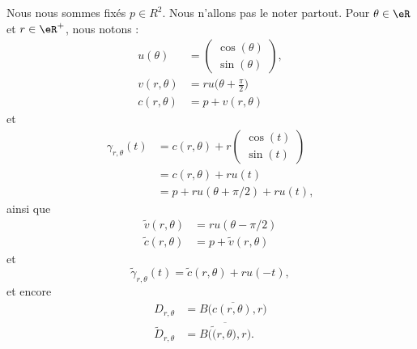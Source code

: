 \begin{normaltext}		\label{NORMooGADXooWShKTZ}

	Nous nous sommes fixés \( p\in R^2\). Nous n'allons pas le noter partout. Pour \( \theta\in \eR\) et \( r\in \eR^+\), nous notons :
	\begin{subequations}
		\begin{align}
			u(\theta)   & =\begin{pmatrix}
				               \cos(\theta) \\
				               \sin(\theta)
			               \end{pmatrix},                       \\
			v(r,\theta) & =ru\big( \theta+\frac{ \pi }{2} \big) \\
			c(r,\theta) & =p+v(r,\theta)
		\end{align}
	\end{subequations}
	et
	\begin{subequations}		\label{EQooNQYRooPaYRuV}
		\begin{align}
			\gamma_{r,\theta}(t) & =c(r,\theta)+r\begin{pmatrix}
				                                     \cos(t) \\
				                                     \sin(t)
			                                     \end{pmatrix} \\
			                     & =c(r,\theta)+ru(t)           \\
			                     & =p+ru(\theta+\pi/2)+ru(t),
		\end{align}
	\end{subequations}
	ainsi que
	\begin{subequations}
		\begin{align}
			\tilde v(r,\theta) & =ru(\theta-\pi/2)     \\
			\tilde c(r,\theta) & =p+\tilde v(r,\theta)
		\end{align}
	\end{subequations}
	et
	\begin{equation}		\label{EQooXPTFooBCszbW}
		\tilde \gamma_{r,\theta}(t)=\tilde c(r,\theta)+r u(-t),
	\end{equation}
	et encore
	\begin{subequations}
		\begin{align}
			D_{r,\theta}        & = \overline{  B\big( c(r,\theta),r \big)  }        \\
			\tilde D_{r,\theta} & = \overline{  B\big( \tilde (r,\theta),r \big)  }.
		\end{align}
	\end{subequations}
\end{normaltext}

